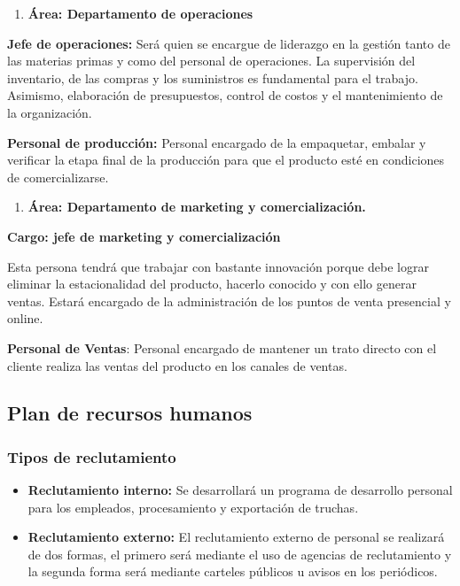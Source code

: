 \documentclass[
  stu,
  floatsintext,
  longtable,
  a4paper,
  nolmodern,
  notxfonts,
  notimes,
  colorlinks=true,linkcolor=blue,citecolor=blue,urlcolor=blue]{apa7}
\providecommand{\tightlist}{%
  \setlength{\itemsep}{0pt}\setlength{\parskip}{0pt}}
\begin{document}
\begin{enumerate}
\def\labelenumi{\alph{enumi})}
\setcounter{enumi}{2}
\tightlist
\item
  \textbf{Área: Departamento de operaciones}
\end{enumerate}

\textbf{Jefe de operaciones:} Será quien se encargue de liderazgo en la
gestión tanto de las materias primas y como del personal de operaciones.
La supervisión del inventario, de las compras y los suministros es
fundamental para el trabajo. Asimismo, elaboración de presupuestos,
control de costos y el mantenimiento de la organización.

\textbf{Personal de producción:} Personal encargado de la empaquetar,
embalar y verificar la etapa final de la producción para que el producto
esté en condiciones de comercializarse.

\begin{enumerate}
\def\labelenumi{\alph{enumi})}
\setcounter{enumi}{3}
\tightlist
\item
  \textbf{Área: Departamento de marketing y comercialización.}
\end{enumerate}

\textbf{Cargo: jefe de marketing y comercialización}

Esta persona tendrá que trabajar con bastante innovación porque debe
lograr eliminar la estacionalidad del producto, hacerlo conocido y con
ello generar ventas. Estará encargado de la administración de los puntos
de venta presencial y online.

\textbf{Personal de Ventas}: Personal encargado de mantener un trato
directo con el cliente realiza las ventas del producto en los canales de
ventas.

\subsection{Plan de recursos humanos}\label{plan-de-recursos-humanos}

\subsubsection{Tipos de reclutamiento}\label{tipos-de-reclutamiento}

\begin{itemize}
\tightlist
\item
  \hspace{0pt} \textbf{Reclutamiento interno:} Se desarrollará un
  programa de desarrollo personal para los empleados, procesamiento y
  exportación de truchas.
\item
  \textbf{\hspace{0pt} Reclutamiento externo:} El reclutamiento externo
  de personal se realizará de dos formas, el primero será mediante el
  uso de agencias de reclutamiento y la segunda forma será mediante
  carteles públicos u avisos en los periódicos.
\end{itemize}
\end{document}
